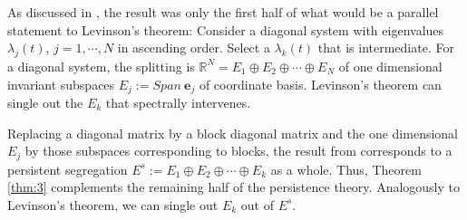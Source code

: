 \documentclass[a4paper,11pt]{article}
\newcounter{Theorem}
\theoremstyle{remark}
\begin{document}
As discussed in \cite{L19}, the result was only the first half of what would be a parallel statement to Levinson's theorem: Consider a diagonal system with eigenvalues $\lambda_j(t)$, $j=1,\cdots,N$ in ascending order.  Select a $\lambda_k(t)$ that is intermediate. For a diagonal system, the splitting is $\mathbb{R}^N= E_1 \oplus E_2 \oplus \cdots \oplus E_N$ of one dimensional invariant subspaces $E_j := Span~ \mathbf{e}_j$ of coordinate basis. Levinson's theorem can single out the $E_k$ that spectrally intervenes.

Replacing a diagonal matrix by a block diagonal matrix and the one dimensional $E_j$ by those subspaces corresponding to blocks, the result from \cite[Theorem 1]{L19} corresponds to a persistent segregation  $E^s:=E_1 \oplus E_2 \oplus \cdots \oplus E_k$ as a whole. Thus, Theorem \ref{thm:3} complements the remaining half of the persistence theory. Analogously to Levinson's theorem, we can single out $E_k$ out of $E^s$. %
\end{document}
